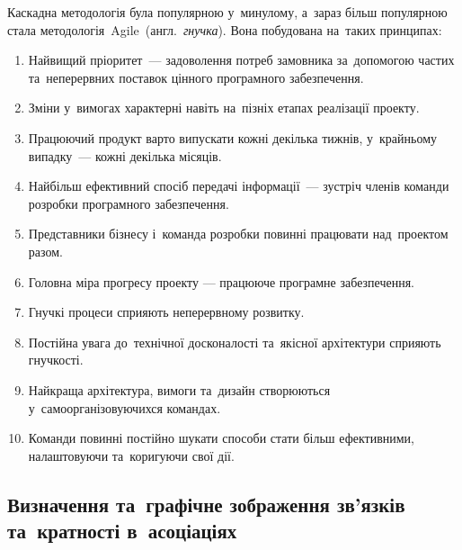 \documentclass[
  a4paper,
  oneside,
  BCOR = 10mm,
  DIV = 12,
  12pt,
  headings = normal,
]{scrartcl}
\newcommand{\transeng}[1]{{англ.}~\textit{\textenglish{#1}}}
\begin{document}
      Каскадна методологія була популярною у~минулому, а~зараз більш популярною стала методологія~\textenglish{Agile}~(\transeng{гнучка}). Вона побудована на~таких принципах:
      \begin{enumerate}
        \item Найвищий пріоритет~— задоволення потреб замовника за~допомогою частих та~неперервних поставок цінного програмного забезпечення.
        \item Зміни у~вимогах характерні навіть на~пізніх етапах реалізації проекту.
        \item Працюючий продукт варто випускати кожні декілька тижнів, у~крайньому випадку~— кожні декілька місяців.
        \item Найбільш ефективний спосіб передачі інформації~— зустріч членів команди розробки програмного забезпечення.
        \item Представники бізнесу і~команда розробки повинні працювати над~проектом разом.
        \item Головна міра прогресу проекту — працююче програмне забезпечення.
        \item Гнучкі процеси сприяють неперервному розвитку.
        \item Постійна увага до~технічної досконалості та~якісної архітектури сприяють гнучкості.
        \item Найкраща архітектура, вимоги та~дизайн створюються у~самоорганізовуючихся командах.
        \item Команди повинні постійно шукати способи стати більш ефективними, налаштовуючи та~коригуючи свої дії.
      \end{enumerate}

    \subsection{Визначення та~графічне зображення зв'язків та~кратності в~асоціаціях}
\end{document}
